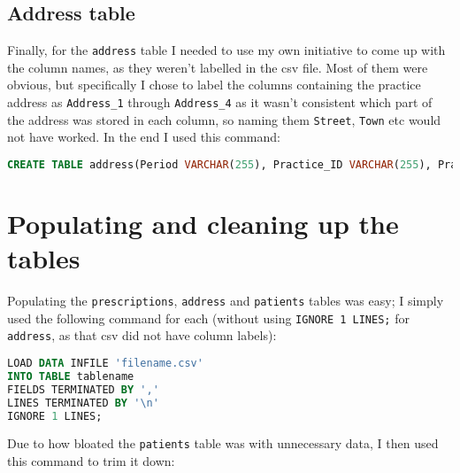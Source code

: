 \documentclass{report}
\begin{document}
\subsection{Address table}
Finally, for the \texttt{address} table I needed to use my own initiative to come up with the column names, as they weren't labelled in the csv file. Most of them were obvious, but specifically I chose to label the columns containing the practice address as \texttt{Address\_1} through \texttt{Address\_4} as it wasn't consistent which part of the address was stored in each column, so naming them \texttt{Street}, \texttt{Town} etc would not have worked. In the end I used this command:

\begin{lstlisting}[language=SQL, caption=Creating the address table]
CREATE TABLE address(Period VARCHAR(255), Practice_ID VARCHAR(255), Practice_Name VARCHAR(255), Address_1 VARCHAR(255), Address_2 VARCHAR(255), Address_3 VARCHAR(255), Address_4 VARCHAR(255), Postcode VARCHAR(255));
\end{lstlisting}

\section{Populating and cleaning up the tables}
Populating the \texttt{prescriptions}, \texttt{address} and \texttt{patients} tables was easy; I simply used the following command for each (without using \lstinline{IGNORE 1 LINES;} for \texttt{address}, as that csv did not have column labels):

\begin{lstlisting}[language=SQL, caption=Loading data into tables]
LOAD DATA INFILE 'filename.csv'
INTO TABLE tablename
FIELDS TERMINATED BY ','
LINES TERMINATED BY '\n'
IGNORE 1 LINES;
\end{lstlisting}

Due to how bloated the \texttt{patients} table was with unnecessary data, I then used this command to trim it down:
\end{document}
